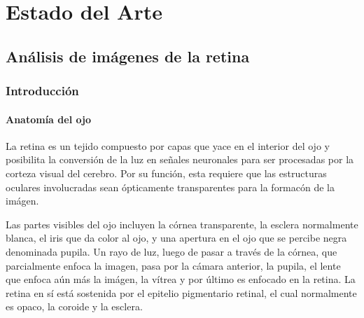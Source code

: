 
\chapter{Estado del Arte} %

\label{Chapter2} %


\section{An\'alisis  de im\'agenes de la retina}

	\subsection{Introducci\'on}

		\subsubsection{Anatom\'ia del ojo}

La retina es un tejido compuesto por capas que yace en el interior del ojo y posibilita la conversi\'on de la luz en se\~nales neuronales para ser procesadas por la corteza visual del cerebro. Por su funci\'on, esta requiere que las estructuras oculares involucradas sean \'opticamente transparentes para la formac\'on de la im\'agen.

Las partes visibles del ojo incluyen la córnea transparente, la esclera normalmente blanca, el iris que da color al ojo, y una apertura en el ojo que se percibe negra denominada pupila. Un rayo de luz, luego de pasar a través de la córnea, que parcialmente enfoca la imagen, pasa por la cámara anterior, la pupila, el lente que enfoca aún más la imágen, la vítrea y por último es enfocado en la retina. La retina en sí está sostenida por el epitelio pigmentario retinal, el cual normalmente es opaco, la coroide y la esclera.

